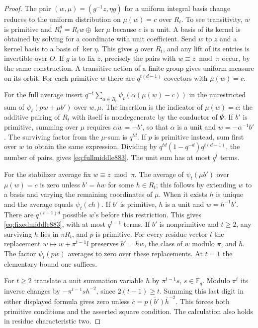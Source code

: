 \documentclass[a4paper,11pt]{article}
\theoremstyle{definition}
\theoremstyle{remark}
\numberwithin{equation}{section}
\begin{document}
\begin{proof}
The pair \((w,\mu)=(g^{-1}z,\eta g)\) for a uniform integral
basis change reduces to the uniform distribution on
\(\mu(w)=c\) over \(R_t\). To see transitivity, \(w\) is primitive
and \(R_t^d=R_t w\oplus\ker\mu\) because \(c\) is a unit.
A basis of its kernel is obtained by solving for a coordinate
with unit coefficient. Send \(w\) to \(z\) and a kernel basis
to a basis of \(\ker\eta\). This gives \(g\) over \(R_t\),
and any lift of its entries is invertible over \(O\). If
\(g\) is to fix \(\bar z\), precisely the pairs with
\(w\equiv z\bmod\pi\) occur, by the same construction. A
transitive action of a finite group gives uniform measure on its
orbit. For each primitive \(w\) there are \(q^{t(d-1)}\)
covectors with \(\mu(w)=c\).

For the full average insert
\(q^{-t}\sum_{\alpha\in R_t}\psi_t(\alpha(\mu(w)-c))\)
in the unrestricted sum of \(\psi_t(pw+\mu b')\) over \(w,\mu\).
The insertion is the indicator of \(\mu(w)=c\): the additive
pairing of \(R_t\) with itself is nondegenerate by the
conductor of \(\Psi\). If \(b'\) is primitive, summing over
\(\mu\) requires \(\alpha w=-b'\), so that \(\alpha\) is a unit
and \(w=-\alpha^{-1}b'\). The surviving factor from the
\(\mu\)-sum is \(q^{td}\). If \(p\) is primitive instead,
sum first over \(w\) to obtain the same expression. Dividing by
\(q^{td}(1-q^{-d})q^{t(d-1)}\), the number of pairs, gives
\eqref{eq:fullmiddle883}. The unit sum has at most \(q^t\) terms.

For the stabilizer average fix \(w\equiv z\bmod\pi\). The
average of \(\psi_t(\mu b')\) over \(\mu(w)=c\) is zero unless
\(b'=h w\) for some \(h\in R_t\); this follows by extending \(w\)
to a basis and varying the remaining coordinates of \(\mu\).
When it exists \(h\) is unique and the average equals
\(\psi_t(ch)\). If \(b'\) is primitive, \(h\) is a unit and
\(w=h^{-1}b'\). There are \(q^{(t-1)d}\) possible \(w\)'s before
this restriction. This gives \eqref{eq:fixedmiddle883}, with at
most \(q^{t-1}\) terms. If \(b'\) is nonprimitive and \(t\ge2\),
any surviving \(h\) lies in \(\pi R_t\), and \(p\) is primitive.
For every residue vector \(l\) the replacement
\(w\mapsto w+\pi^{t-1}l\) preserves \(b'=hw\), the class of \(w\)
modulo \(\pi\), and \(h\). The factor \(\psi_t(pw)\) averages to
zero over these replacements. At \(t=1\) the elementary bound
one suffices.

For \(t\ge2\) translate a unit summation variable \(h\) by
\(\pi^{t-1}s\), \(s\in\mathbb F_q\). Modulo \(\pi^t\) its inverse
changes by \(-\pi^{t-1}s h^{-2}\), since \(2(t-1)\ge t\).
Summing this last digit in either displayed formula gives zero
unless \(\bar c=\overline{p(b')}\bar h^{-2}\). This forces both
primitive conditions and the asserted square condition. The
calculation also holds in residue characteristic two.
\end{proof}
\end{document}
